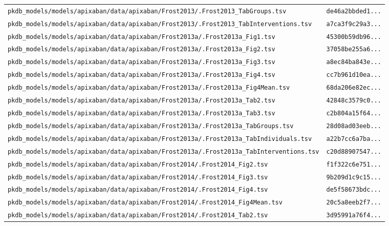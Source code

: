 \begin{longtable}{ll}
\texttt{pkdb\_models/models/apixaban/data/apixaban/Frost2013/.Frost2013\_TabGroups.tsv} & \texttt{de46a2bbded1...} \\
\texttt{pkdb\_models/models/apixaban/data/apixaban/Frost2013/.Frost2013\_TabInterventions.tsv} & \texttt{a7ca3f9c29a3...} \\
\texttt{pkdb\_models/models/apixaban/data/apixaban/Frost2013a/.Frost2013a\_Fig1.tsv} & \texttt{45300b59db96...} \\
\texttt{pkdb\_models/models/apixaban/data/apixaban/Frost2013a/.Frost2013a\_Fig2.tsv} & \texttt{37058be255a6...} \\
\texttt{pkdb\_models/models/apixaban/data/apixaban/Frost2013a/.Frost2013a\_Fig3.tsv} & \texttt{a8ec84ba843e...} \\
\texttt{pkdb\_models/models/apixaban/data/apixaban/Frost2013a/.Frost2013a\_Fig4.tsv} & \texttt{cc7b961d10ea...} \\
\texttt{pkdb\_models/models/apixaban/data/apixaban/Frost2013a/.Frost2013a\_Fig4Mean.tsv} & \texttt{68da206e82ec...} \\
\texttt{pkdb\_models/models/apixaban/data/apixaban/Frost2013a/.Frost2013a\_Tab2.tsv} & \texttt{42848c3579c0...} \\
\texttt{pkdb\_models/models/apixaban/data/apixaban/Frost2013a/.Frost2013a\_Tab3.tsv} & \texttt{c2b804a15f64...} \\
\texttt{pkdb\_models/models/apixaban/data/apixaban/Frost2013a/.Frost2013a\_TabGroups.tsv} & \texttt{28d08ad03eeb...} \\
\texttt{pkdb\_models/models/apixaban/data/apixaban/Frost2013a/.Frost2013a\_TabIndividuals.tsv} & \texttt{a22b7cc6a7ba...} \\
\texttt{pkdb\_models/models/apixaban/data/apixaban/Frost2013a/.Frost2013a\_TabInterventions.tsv} & \texttt{c20d88907547...} \\
\texttt{pkdb\_models/models/apixaban/data/apixaban/Frost2014/.Frost2014\_Fig2.tsv} & \texttt{f1f322c6e751...} \\
\texttt{pkdb\_models/models/apixaban/data/apixaban/Frost2014/.Frost2014\_Fig3.tsv} & \texttt{9b209d1c9c15...} \\
\texttt{pkdb\_models/models/apixaban/data/apixaban/Frost2014/.Frost2014\_Fig4.tsv} & \texttt{de5f58673bdc...} \\
\texttt{pkdb\_models/models/apixaban/data/apixaban/Frost2014/.Frost2014\_Fig4Mean.tsv} & \texttt{20c5a8eeb2f7...} \\
\texttt{pkdb\_models/models/apixaban/data/apixaban/Frost2014/.Frost2014\_Tab2.tsv} & \texttt{3d95991a76f4...} \\

\end{longtable}
